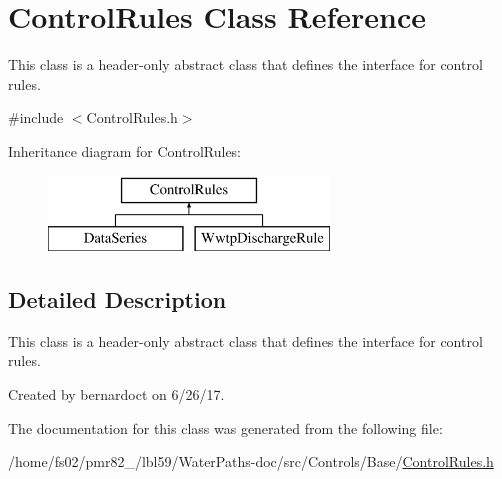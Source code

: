 \hypertarget{classControlRules}{}\section{Control\+Rules Class Reference}
\label{classControlRules}


This class is a header-\/only abstract class that defines the interface for control rules.  




{\ttfamily \#include $<$Control\+Rules.\+h$>$}

Inheritance diagram for Control\+Rules\+:\begin{figure}[H]
\begin{center}
\leavevmode
\includegraphics[height=2.000000cm]{classControlRules}
\end{center}
\end{figure}


\subsection{Detailed Description}
This class is a header-\/only abstract class that defines the interface for control rules. 

Created by bernardoct on 6/26/17. 

The documentation for this class was generated from the following file\+:\begin{DoxyCompactItemize}
\item 
/home/fs02/pmr82\+\_/lbl59/\+Water\+Paths-\/doc/src/\+Controls/\+Base/\mbox{\hyperlink{ControlRules_8h}{Control\+Rules.\+h}}\end{DoxyCompactItemize}
